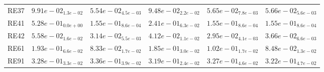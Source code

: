 \documentclass{article}
\begin{document}
\begin{table}
\begin{scriptsize}
\begin{tabular}{llllll}
RE37 & $  9.91e-02_{ 1.3e-02}$ & \cellcolor{gray95}$  5.54e-02_{ 4.5e-03}$ & $  9.48e-02_{ 2.2e-02}$ & \cellcolor{gray25}$  5.65e-02_{ 7.8e-03}$ & $  5.66e-02_{ 5.6e-03}$ \\
RE41 & $  5.28e-01_{ 0.0e+00}$ & \cellcolor{gray95}$  1.55e-01_{ 8.6e-04}$ & $  2.41e-01_{ 6.3e-02}$ & \cellcolor{gray25}$  1.55e-01_{ 8.6e-04}$ & $  1.55e-01_{ 8.6e-04}$ \\
RE42 & $  5.58e-02_{ 1.6e-02}$ & \cellcolor{gray25}$  3.14e-02_{ 5.5e-03}$ & $  4.12e-02_{ 1.1e-02}$ & \cellcolor{gray95}$  2.95e-02_{ 4.1e-03}$ & $  3.66e-02_{ 6.6e-03}$ \\
RE61 & $  1.93e-01_{ 6.6e-02}$ & \cellcolor{gray95}$  8.33e-02_{ 1.7e-02}$ & $  1.85e-01_{ 3.0e-02}$ & $  1.02e-01_{ 1.7e-02}$ & \cellcolor{gray25}$  8.48e-02_{ 1.3e-02}$ \\
RE91 & $  3.28e-01_{ 3.3e-02}$ & $  3.36e-01_{ 3.9e-02}$ & \cellcolor{gray95}$  3.19e-01_{ 2.4e-02}$ & $  3.27e-01_{ 4.6e-02}$ & \cellcolor{gray25}$  3.22e-01_{ 4.7e-02}$ \\
\hline
\end{tabular}
\end{scriptsize}
\end{table}
\end{document}
